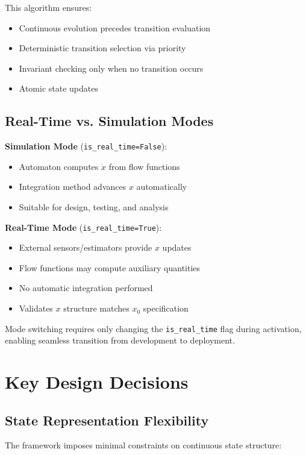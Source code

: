 \documentclass[conference]{IEEEtran}
\begin{document}
This algorithm ensures:
\begin{itemize}
\item Continuous evolution precedes transition evaluation
\item Deterministic transition selection via priority
\item Invariant checking only when no transition occurs
\item Atomic state updates
\end{itemize}

\subsection{Real-Time vs. Simulation Modes}

\textbf{Simulation Mode} (\texttt{is\_real\_time=False}):
\begin{itemize}
\item Automaton computes $\dot{x}$ from flow functions
\item Integration method advances $x$ automatically
\item Suitable for design, testing, and analysis
\end{itemize}

\textbf{Real-Time Mode} (\texttt{is\_real\_time=True}):
\begin{itemize}
\item External sensors/estimators provide $x$ updates
\item Flow functions may compute auxiliary quantities
\item No automatic integration performed
\item Validates $x$ structure matches $x_0$ specification
\end{itemize}

Mode switching requires only changing the \texttt{is\_real\_time} flag during activation, enabling seamless transition from development to deployment.

\section{Key Design Decisions}

\subsection{State Representation Flexibility}

The framework imposes minimal constraints on continuous state structure:
\end{document}
